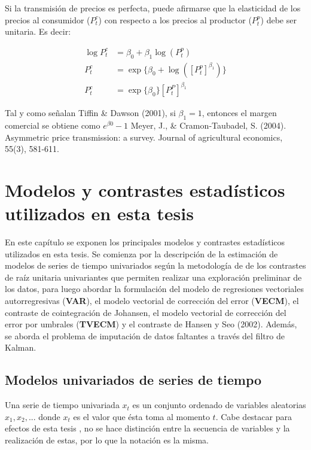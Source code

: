 \documentclass[12pt, twoside]{book}\usepackage[]{graphicx}\usepackage[]{color}
\numberwithin{equation}{section}
\numberwithin{theorem}{section}
\numberwithin{teorema}{section}
\numberwithin{defi}{section}
\numberwithin{prop}{section}
\numberwithin{defi}{section}
\theoremstyle{plain}
\begin{document}
Si la transmisión de precios es perfecta, puede afirmarse que la elasticidad de los precios al consumidor ($P_{t}^{c}$) con respecto a los precios al productor ($P_{t}^{p}$) debe ser unitaria. Es decir: 

\begin{align}
\log P_{t}^{c} & = \beta_{0}+\beta_1 \log(P_{t}^{p}) \\ 
P_{t}^{c} & = \exp\{\beta_{0}+ \log([P_{t}^{p}]^{\beta_{1}})\} \\
P_{t}^{c} & = \exp\{\beta_{0}\}[P_{t}^{P}]^{\beta_1} \label{margen}
\end{align}

Tal y como señalan Tiffin \& Dawson (2001), si $\beta_{1}=1$, entonces el margen comercial se obtiene como $e^{\beta0}-1$
Meyer, J., \& Cramon‐Taubadel, S. (2004). Asymmetric price transmission: a survey. Journal of agricultural economics, 55(3), 581-611.


\chapter{Modelos y contrastes estadísticos utilizados en esta tesis}

En este capítulo se exponen los principales modelos y contrastes estadísticos utilizados en esta tesis. Se comienza por la descripción de la estimación de modelos de series de tiempo univariados según la metodología de de los contrastes de raíz unitaria univariantes que permiten realizar una exploración preliminar de los datos, para luego abordar la formulación del modelo de regresiones vectoriales autorregresivas (\textbf{VAR}), el modelo vectorial de corrección del error (\textbf{VECM}), el contraste de cointegración de Johansen, el modelo vectorial de corrección del error por umbrales (\textbf{TVECM}) y el contraste de Hansen y Seo (2002). Además, se aborda el problema de imputación de datos faltantes a través del filtro de Kalman. 


\section{Modelos univariados de series de tiempo}

Una serie de tiempo univariada $x_{t}$ es un conjunto ordenado de variables aleatorias $x_{1},x_{2},...$ donde $x_{t}$ es el valor que ésta toma al momento $t$. Cabe destacar para efectos de esta tesis , no se hace distinción entre la secuencia de variables y la realización de estas, por lo que la notación es la misma. 
\end{document}
